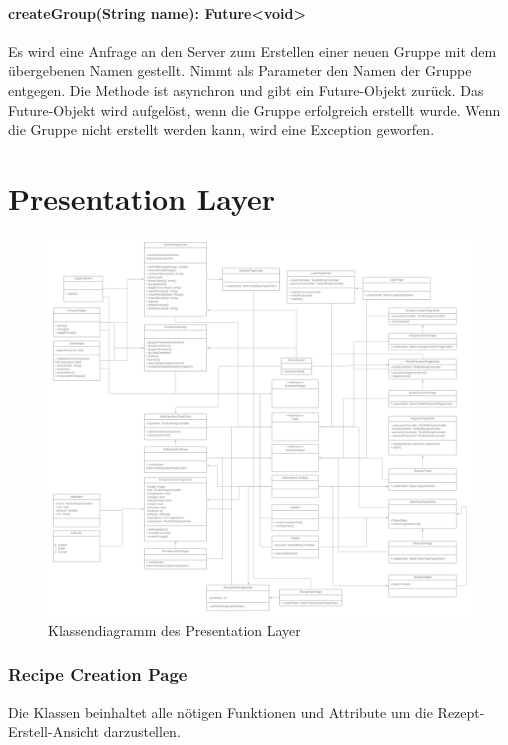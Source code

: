 \documentclass[parskip=full]{scrartcl}
\begin{document}
\paragraph{createGroup(String name): Future<void>}
Es wird eine Anfrage an den Server zum Erstellen einer neuen Gruppe mit dem übergebenen Namen gestellt. Nimmt als Parameter den Namen der Gruppe entgegen. Die Methode ist asynchron und gibt ein Future-Objekt zurück. Das Future-Objekt wird aufgelöst, wenn die Gruppe erfolgreich erstellt wurde. Wenn die Gruppe nicht erstellt werden kann, wird eine Exception geworfen.

\section{Presentation Layer}
\begin{figure}[htp]
    \centering
    \includegraphics[width = \textwidth]{images/presentationLayer/presentationLayer.png}
    \caption{Klassendiagramm des Presentation Layer}
    \label{fig:presentation-layer}
\end{figure}

\newpage
\subsubsection{Recipe Creation Page}
Die Klassen beinhaltet alle nötigen Funktionen und Attribute um die Rezept-Erstell-Ansicht darzustellen.\newline
\end{document}
